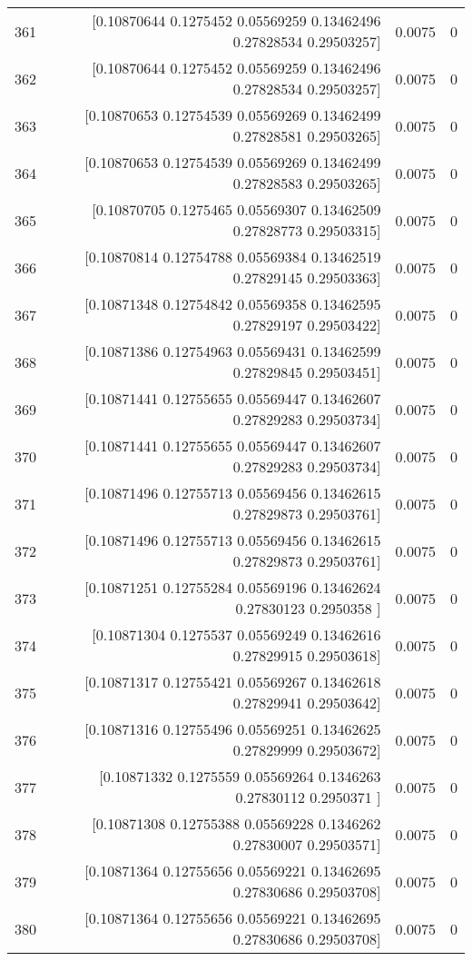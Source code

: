 \begin{longtable}{lrrr}
361 & [0.10870644 0.1275452  0.05569259 0.13462496 0.27828534 0.29503257] & 0.0075 & 0 \\
362 & [0.10870644 0.1275452  0.05569259 0.13462496 0.27828534 0.29503257] & 0.0075 & 0 \\
363 & [0.10870653 0.12754539 0.05569269 0.13462499 0.27828581 0.29503265] & 0.0075 & 0 \\
364 & [0.10870653 0.12754539 0.05569269 0.13462499 0.27828583 0.29503265] & 0.0075 & 0 \\
365 & [0.10870705 0.1275465  0.05569307 0.13462509 0.27828773 0.29503315] & 0.0075 & 0 \\
366 & [0.10870814 0.12754788 0.05569384 0.13462519 0.27829145 0.29503363] & 0.0075 & 0 \\
367 & [0.10871348 0.12754842 0.05569358 0.13462595 0.27829197 0.29503422] & 0.0075 & 0 \\
368 & [0.10871386 0.12754963 0.05569431 0.13462599 0.27829845 0.29503451] & 0.0075 & 0 \\
369 & [0.10871441 0.12755655 0.05569447 0.13462607 0.27829283 0.29503734] & 0.0075 & 0 \\
370 & [0.10871441 0.12755655 0.05569447 0.13462607 0.27829283 0.29503734] & 0.0075 & 0 \\
371 & [0.10871496 0.12755713 0.05569456 0.13462615 0.27829873 0.29503761] & 0.0075 & 0 \\
372 & [0.10871496 0.12755713 0.05569456 0.13462615 0.27829873 0.29503761] & 0.0075 & 0 \\
373 & [0.10871251 0.12755284 0.05569196 0.13462624 0.27830123 0.2950358 ] & 0.0075 & 0 \\
374 & [0.10871304 0.1275537  0.05569249 0.13462616 0.27829915 0.29503618] & 0.0075 & 0 \\
375 & [0.10871317 0.12755421 0.05569267 0.13462618 0.27829941 0.29503642] & 0.0075 & 0 \\
376 & [0.10871316 0.12755496 0.05569251 0.13462625 0.27829999 0.29503672] & 0.0075 & 0 \\
377 & [0.10871332 0.1275559  0.05569264 0.1346263  0.27830112 0.2950371 ] & 0.0075 & 0 \\
378 & [0.10871308 0.12755388 0.05569228 0.1346262  0.27830007 0.29503571] & 0.0075 & 0 \\
379 & [0.10871364 0.12755656 0.05569221 0.13462695 0.27830686 0.29503708] & 0.0075 & 0 \\
380 & [0.10871364 0.12755656 0.05569221 0.13462695 0.27830686 0.29503708] & 0.0075 & 0 \\

\end{longtable}
